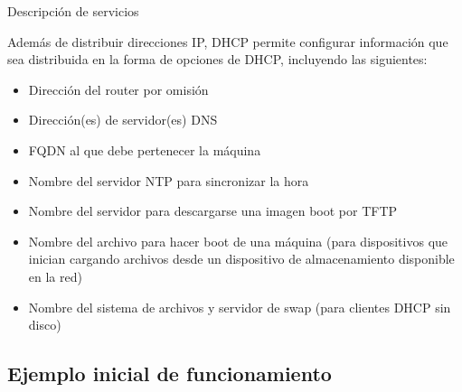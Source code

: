 \begin{frame}{Descripción de servicios} %

   Además de distribuir direcciones IP, DHCP permite configurar información que
   sea distribuida en la forma de opciones de DHCP, incluyendo las siguientes:

   \begin{itemize}
       \item Dirección del router por omisión
       \item Dirección(es) de servidor(es) DNS
       \item FQDN al que debe pertenecer la máquina
       \item Nombre del servidor NTP para sincronizar la hora
       \item Nombre del servidor para descargarse una imagen boot por TFTP
       \item Nombre del archivo para hacer boot de una máquina (para dispositivos que inician
       cargando archivos desde un dispositivo de almacenamiento disponible en
       la red)
       \item Nombre del sistema de archivos y servidor de swap (para clientes
       DHCP sin disco)
   \end{itemize}

\end{frame}

\subsection{Ejemplo inicial de funcionamiento} %
\label{sub:Ejemplo inicial de funcionamiento}


